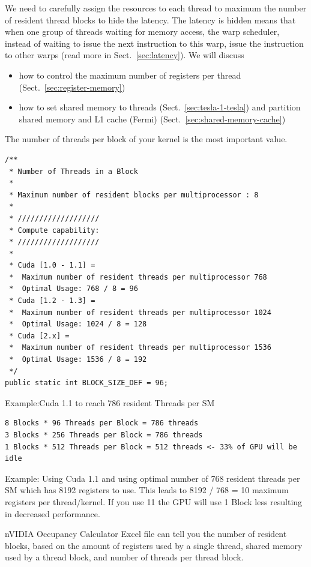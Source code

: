 We need to carefully assign the resources to each thread to maximum the
number of resident thread blocks to hide the latency. The latency is hidden
means that when one group of threads waiting for memory access, the warp
scheduler, instead of waiting to issue the next instruction to this warp, issue
the instruction to other warps (read more in Sect.~\ref{sec:latency}). We will
discuss
\begin{itemize}
\item how to control the maximum number of registers per thread
  (Sect.~\ref{sec:register-memory})
\item how to set shared memory to threads
  (Sect.~\ref{sec:tesla-1-tesla}) and partition shared memory and L1
  cache (Fermi) (Sect.~\ref{sec:shared-memory-cache})
\end{itemize}

The number of threads per block of your kernel is the most important value.
\begin{verbatim}
/**
 * Number of Threads in a Block
 *
 * Maximum number of resident blocks per multiprocessor : 8
 *
 * ///////////////////
 * Compute capability:
 * ///////////////////
 *
 * Cuda [1.0 - 1.1] =   
 *  Maximum number of resident threads per multiprocessor 768
 *  Optimal Usage: 768 / 8 = 96
 * Cuda [1.2 - 1.3] =
 *  Maximum number of resident threads per multiprocessor 1024
 *  Optimal Usage: 1024 / 8 = 128
 * Cuda [2.x] =
 *  Maximum number of resident threads per multiprocessor 1536
 *  Optimal Usage: 1536 / 8 = 192
 */ 
public static int BLOCK_SIZE_DEF = 96;
\end{verbatim}

Example:Cuda 1.1 to reach 786 resident Threads per SM
\begin{verbatim}
8 Blocks * 96 Threads per Block = 786 threads
3 Blocks * 256 Threads per Block = 786 threads
1 Blocks * 512 Threads per Block = 512 threads <- 33% of GPU will be idle
\end{verbatim}
Example: Using Cuda 1.1 and using optimal number of 768 resident threads per SM
which has 8192 registers to use. This leads to 8192 / 768 = 10 maximum
registers per thread/kernel. If you use 11 the GPU will use 1 Block less
resulting in decreased performance.  

\begin{framed}
  nVIDIA Occupancy Calculator Excel file can tell you the number of
  resident blocks, based on the amount of registers used by a single
  thread, shared memory used by a thread block, and number of threads
  per thread block.
\end{framed}

